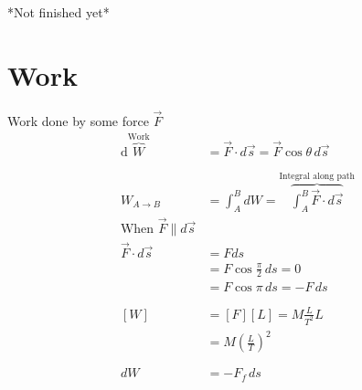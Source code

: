 \documentclass[12pt]{article}
\begin{document}
*Not finished yet*

\section{Work}
Work done by some force $\overrightarrow{F}$
\begin{align*}
	\text{d}\overbrace{W}^\text{Work}             & = \overrightarrow{F} \cdot d \overrightarrow{s} = \overrightarrow{F} \cos{\theta} \, d \overrightarrow{s}     \\
	\phantom{=}                                                                                                                                                   \\
	W_{A \to B}                                   & = \int_A^B dW = \overbrace{\int_A^B \overrightarrow{F} \cdot d \overrightarrow{s}}^\text{Integral along path} \\
	\text{When } \overrightarrow{F} \parallel d \overrightarrow{s}                                                                                                \\
	\overrightarrow{F} \cdot d \overrightarrow{s} & = F ds                                                                                                        \\
	                                              & = F \cos{\frac{\pi}{2}} \, ds = 0                                                                             \\
	                                              & = F \cos{\pi} \, ds = -F \, ds                                                                                \\
	\phantom{=}                                                                                                                                                   \\
	[W]                                           & = [F] [L] = M \frac{L}{T^2} L                                                                                 \\
	                                              & = M \left(\frac{L}{T}\right)^2                                                                                \\
	\phantom{=}                                                                                                                                                   \\
	dW                                            & = -F_f \, ds                                                                                                  \\

\end{align*}
\end{document}
